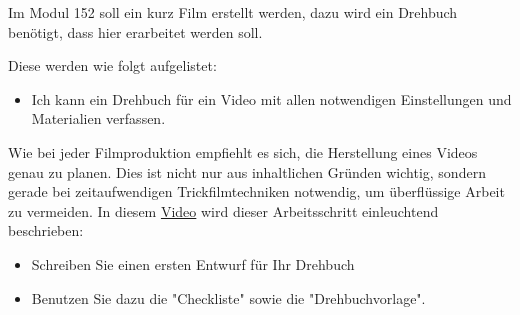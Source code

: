 
\label{einleitung}
\setcounter{page}{1}
\normalsize
Im Modul 152 soll ein kurz Film erstellt werden, dazu wird ein Drehbuch benötigt, dass hier erarbeitet werden soll.

Diese werden wie folgt aufgelistet:
\begin{itemize}
    \item Ich kann ein Drehbuch für ein Video mit allen notwendigen Einstellungen und Materialien verfassen.
\end{itemize}

Wie bei jeder Filmproduktion empfiehlt es sich, die Herstellung eines Videos genau zu planen.
Dies ist nicht nur aus inhaltlichen Gründen wichtig, sondern gerade bei zeitaufwendigen Trickfilmtechniken notwendig,
um überflüssige Arbeit zu vermeiden.
In diesem \href{https://moodle.talent-factory.ch/login/index.php}{Video} wird dieser Arbeitsschritt einleuchtend beschrieben:
\begin{itemize}
    \item Schreiben Sie einen ersten Entwurf für Ihr Drehbuch
    \item Benutzen Sie dazu die "Checkliste" sowie die "Drehbuchvorlage".
\end{itemize}

